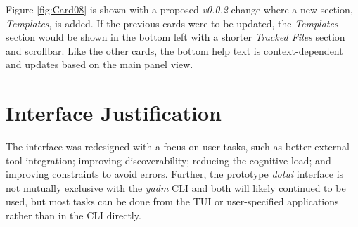 \documentclass[letterpaper]{jdf}
\begin{document}
\begin{jdffigure}
\label{fig:Card07}
\end{jdffigure}

 Figure \ref{fig:Card08} is shown with a proposed \emph{v0.0.2} change where a new section, \emph{Templates}, is added. If the previous cards were to be updated, the \emph{Templates} section would be shown in the bottom left with a shorter \emph{Tracked Files} section and scrollbar. Like the other cards, the bottom help text is context-dependent and updates based on the main panel view.

\begin{jdffigure}
\label{fig:Card08}
\end{jdffigure}

\section{Interface Justification}
The interface was redesigned with a focus on user tasks, such as better external tool integration; improving discoverability; reducing the cognitive load; and improving constraints to avoid errors. Further, the prototype \emph{dotui} interface is not mutually exclusive with the \emph{yadm} CLI and both will likely continued to be used, but most tasks can be done from the TUI or user-specified applications rather than in the CLI directly.
\end{document}

